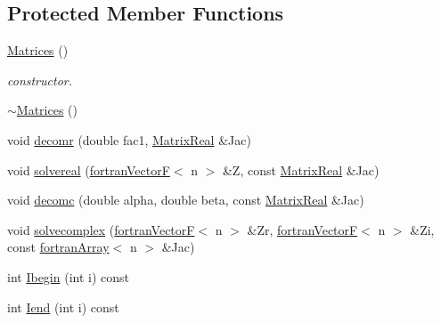 \subsection*{Protected Member Functions}
\begin{DoxyCompactItemize}
\item 
\hyperlink{classodes_1_1Matrices_3_01true_00_01true_00_01n_00_01nsub_00_01nsup_01_4_a27dbc5fade1db5c5d9b1ccca51a0ead0}{Matrices} ()
\begin{DoxyCompactList}\small\item\em constructor. \end{DoxyCompactList}\item 
\hyperlink{classodes_1_1Matrices_3_01true_00_01true_00_01n_00_01nsub_00_01nsup_01_4_a5942ae878532fd61f899e97b4261c43f}{$\sim$\-Matrices} ()
\item 
void \hyperlink{classodes_1_1Matrices_3_01true_00_01true_00_01n_00_01nsub_00_01nsup_01_4_a8cd0779d5bb48e5d2516dfdf16de6a09}{decomr} (double fac1, \hyperlink{classodes_1_1Matrices_3_01true_00_01true_00_01n_00_01nsub_00_01nsup_01_4_a9c13d85a737f0806d9cfff89d3d59c52}{Matrix\-Real} \&Jac)
\item 
void \hyperlink{classodes_1_1Matrices_3_01true_00_01true_00_01n_00_01nsub_00_01nsup_01_4_a5a895d98e6090e13f17ffb9810f701de}{solvereal} (\hyperlink{classodes_1_1fortranVectorF}{fortran\-Vector\-F}$<$ n $>$ \&Z, const \hyperlink{classodes_1_1Matrices_3_01true_00_01true_00_01n_00_01nsub_00_01nsup_01_4_a9c13d85a737f0806d9cfff89d3d59c52}{Matrix\-Real} \&Jac)
\item 
void \hyperlink{classodes_1_1Matrices_3_01true_00_01true_00_01n_00_01nsub_00_01nsup_01_4_afed6a39b120245ba6edcf4f63f6de12d}{decomc} (double alpha, double beta, const \hyperlink{classodes_1_1Matrices_3_01true_00_01true_00_01n_00_01nsub_00_01nsup_01_4_a9c13d85a737f0806d9cfff89d3d59c52}{Matrix\-Real} \&Jac)
\item 
void \hyperlink{classodes_1_1Matrices_3_01true_00_01true_00_01n_00_01nsub_00_01nsup_01_4_a1e0221f169b52fa3ea0cc8fc9b183000}{solvecomplex} (\hyperlink{classodes_1_1fortranVectorF}{fortran\-Vector\-F}$<$ n $>$ \&Zr, \hyperlink{classodes_1_1fortranVectorF}{fortran\-Vector\-F}$<$ n $>$ \&Zi, const \hyperlink{classodes_1_1fortranArray}{fortran\-Array}$<$ n $>$ \&Jac)
\item 
int \hyperlink{classodes_1_1Matrices_3_01true_00_01true_00_01n_00_01nsub_00_01nsup_01_4_aae6b47d39f156823d04c5f30f59ed7e0}{Ibegin} (int i) const 
\item 
int \hyperlink{classodes_1_1Matrices_3_01true_00_01true_00_01n_00_01nsub_00_01nsup_01_4_a512627e0c148c63137533dda97c866d4}{Iend} (int i) const 
\end{DoxyCompactItemize}
